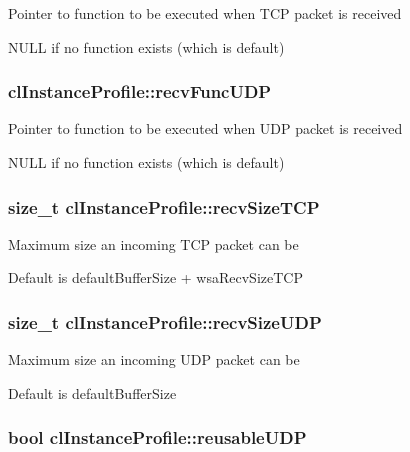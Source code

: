 \label{classcl_instance_profile_a5256ee272d945f53112a34b5c18136fa}
Pointer to function to be executed when TCP packet is received \par
 NULL if no function exists (which is default) \hypertarget{classcl_instance_profile_a87180abaad2454e208eab1d4343ee926}{
\subsubsection[{recvFuncUDP}]{ {\bf clInstanceProfile::recvFuncUDP}}}
\label{classcl_instance_profile_a87180abaad2454e208eab1d4343ee926}
Pointer to function to be executed when UDP packet is received \par
 NULL if no function exists (which is default) \hypertarget{classcl_instance_profile_a8fe7056f9e48febf975fbbc932df6395}{
\subsubsection[{recvSizeTCP}]{\setlength{\rightskip}{0pt plus 5cm}size\_\-t {\bf clInstanceProfile::recvSizeTCP}}}
\label{classcl_instance_profile_a8fe7056f9e48febf975fbbc932df6395}
Maximum size an incoming TCP packet can be \par
 Default is defaultBufferSize + wsaRecvSizeTCP \hypertarget{classcl_instance_profile_a0e937475af0a5614f0475a819aa1b73e}{
\subsubsection[{recvSizeUDP}]{\setlength{\rightskip}{0pt plus 5cm}size\_\-t {\bf clInstanceProfile::recvSizeUDP}}}
\label{classcl_instance_profile_a0e937475af0a5614f0475a819aa1b73e}
Maximum size an incoming UDP packet can be \par
 Default is defaultBufferSize \hypertarget{classcl_instance_profile_a9f2be3ef8894a136d5af5df66150765f}{
\subsubsection[{reusableUDP}]{\setlength{\rightskip}{0pt plus 5cm}bool {\bf clInstanceProfile::reusableUDP}}}
